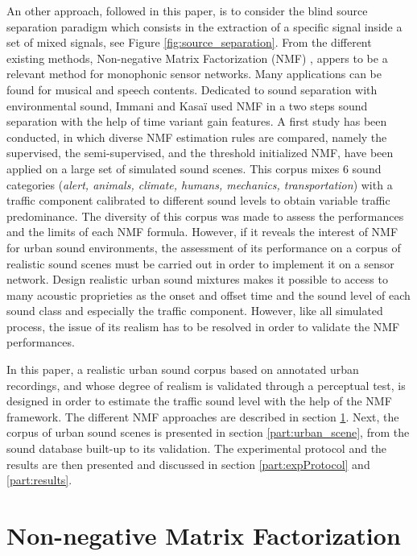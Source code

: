 \documentclass[review,5p,twocolumn,sort&compress,times]{elsarticle}
\begin{document}
An other approach, followed in this paper, is to consider the blind source separation paradigm which consists in the extraction of a specific signal inside a set of mixed signals, see Figure \ref{fig:source_separation}. From the different existing methods, Non-negative Matrix Factorization (NMF) \cite{lee_learning_1999}, appers to be a relevant method for monophonic sensor networks. Many applications can be found for musical \cite{smaragdis_non-negative_2003, benetos2006musical} and speech \cite{wilson_speech_2008, mysore2011non} contents. Dedicated to sound separation with environmental sound, Immani and Kasa\"i \cite{satoshi_innami_nmf-based_2012} used NMF in a two steps sound separation with the help of time variant gain features. 
A first study \cite{gloaguen2018Estimation} has been conducted, in which diverse NMF estimation rules are compared, namely the supervised, the semi-supervised, and the threshold initialized NMF, have been applied on a large set of simulated sound scenes. This corpus mixes 6 sound categories (\textit{alert, animals, climate, humans, mechanics, transportation}) with a traffic component calibrated to different sound levels to obtain variable traffic predominance. 
The diversity of this corpus was made to assess the performances and the limits of each NMF formula. 
However, if it reveals the interest of NMF for urban sound environments, the assessment of its performance on a corpus of realistic sound scenes must be carried out in order to implement it on a sensor network. 
Design realistic urban sound mixtures makes it possible to access to many acoustic proprieties as the onset and offset time and the sound level of each sound class and especially the traffic component. However, like all simulated process, the issue of its realism has to be resolved in order to validate the NMF performances. 

In this paper, a realistic urban sound corpus based on annotated urban recordings, and whose degree of realism is validated through a perceptual test, is designed in order to estimate the traffic sound level with the help of the NMF framework.
The different NMF approaches are described in section \ref{part:nmf}. Next, the corpus of urban sound scenes is presented in section \ref{part:urban_scene}, from the sound database built-up to its validation. The experimental protocol and the results are then presented and discussed in section \ref{part:expProtocol} and \ref{part:results}.

\section{Non-negative Matrix Factorization}\label{part:nmf}
\end{document}
